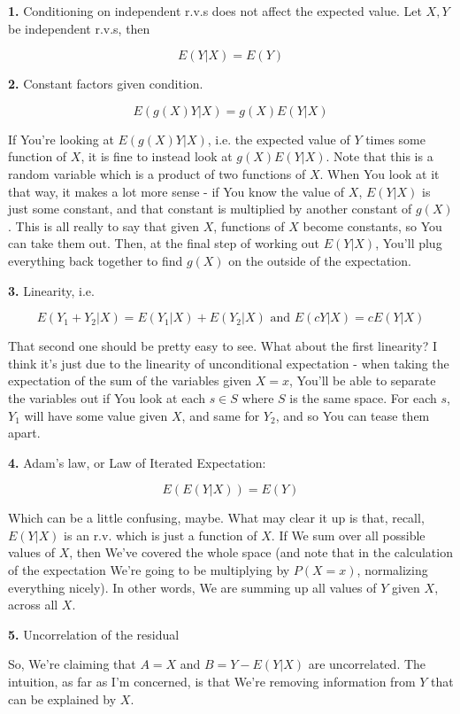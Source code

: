 \documentclass{article}
\begin{document}
		\textbf{1.} Conditioning on independent r.v.s does not affect the expected value. Let $X, Y$ be independent r.v.s, then
		
		\[ E(Y|X) = E(Y) \]

		\textbf{2.} Constant factors given condition. 
		
		\[ E(g(X)Y|X) = g(X)E(Y|X)\]
		
		If You're looking at $E(g(X)Y|X)$, i.e. the expected value of $Y$ times some function of $X$, it is fine to instead look at $g(X)E(Y|X)$. Note that this is a random variable which is a product of two functions of $X$. When You look at it that way, it makes a lot more sense - if You know the value of $X$, $E(Y|X)$ is just some constant, and that constant is multiplied by another constant of $g(X)$. This is all really to say that given $X$, functions of $X$ become constants, so You can take them out. Then, at the final step of working out $E(Y|X)$, You'll plug everything back together to find $g(X)$ on the outside of the expectation.
		
		\textbf{3.} Linearity, i.e. 
		
		\[ E(Y_1+Y_2|X) = E(Y_1|X) + E(Y_2|X)\text{ and }E(cY|X) = cE(Y|X)\] 
		
		That second one should be pretty easy to see. What about the first linearity? I think it's just due to the linearity of unconditional expectation - when taking the expectation of the sum of the variables given $X=x$, You'll be able to separate the variables out if You look at each $s\in S$ where $S$ is the same space. For each $s$, $Y_1$ will have some value given $X$, and same for $Y_2$, and so You can tease them apart.
		
		\textbf{4.} Adam's law, or Law of Iterated Expectation:
		
		\[E(E(Y|X)) = E(Y)\]
		
		Which can be a little confusing, maybe. What may clear it up is that, recall, $E(Y|X)$ is an r.v. which is just a function of $X$. If We sum over all possible values of $X$, then We've covered the whole space (and note that in the calculation of the expectation We're going to be multiplying by $P(X=x)$, normalizing everything nicely). In other words, We are summing up all values of $Y$ given $X$, across all $X$.
		
		\textbf{5.} Uncorrelation of the residual
		
		So, We're claiming that $A = X$ and $B = Y-E(Y|X)$ are uncorrelated. The intuition, as far as I'm concerned, is that We're removing information from $Y$ that can be explained by $X$.
		
\end{document}
